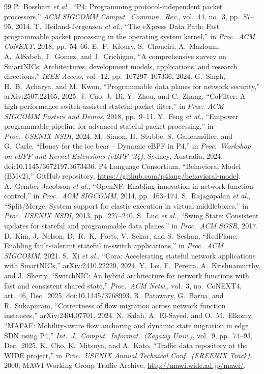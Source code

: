 \documentclass[10pt,twocolumn,letterpaper]{article}
\begin{document}
\begin{thebibliography}{99}\small
{} P.~Bosshart \emph{et al.}, ``P4: Programming protocol-independent packet processors,'' \emph{ACM SIGCOMM Comput.\ Commun.\ Rev.}, vol.~44, no.~3, pp.~87--95, 2014.
 T.~H{\o}iland-J{\o}rgensen \emph{et al.}, ``The eXpress Data Path: Fast programmable packet processing in the operating system kernel,'' in \emph{Proc.\ ACM CoNEXT}, 2018, pp.~54--66.
 E.~F.~Kfoury, S.~Choueiri, A.~Mazloum, A.~AlSabeh, J.~Gomez, and J.~Crichigno, ``A comprehensive survey on SmartNICs: Architectures, development models, applications, and research directions,'' \emph{IEEE Access}, vol.~12, pp.~107297--107336, 2024.
 G.~Singh, H.~B.~Acharya, and M.~Kwon, ``Programmable data planes for network security,'' arXiv:2507.22165, 2025.
 J.~Cao, J.~Bi, Y.~Zhou, and C.~Zhang, ``CoFilter: A high-performance switch-assisted stateful packet filter,'' in \emph{Proc.\ ACM SIGCOMM Posters and Demos}, 2018, pp.~9--11.
 Y.~Feng \emph{et al.}, ``Empower programmable pipeline for advanced stateful packet processing,'' in \emph{Proc.\ USENIX NSDI}, 2024.
 M.~Simon, H.~Stubbe, S.~Gallenm{\"u}ller, and G.~Carle, ``Honey for the ice bear -- Dynamic eBPF in P4,'' in \emph{Proc.\ Workshop on eBPF and Kernel Extensions (eBPF '24)}, Sydney, Australia, 2024, doi:10.1145/3672197.3673436.
 P4 Language Consortium, ``Behavioral Model (BMv2),'' GitHub repository, \url{https://github.com/p4lang/behavioral-model}.
 A.~Gember-Jacobson \emph{et al.}, ``OpenNF: Enabling innovation in network function control,'' in \emph{Proc.\ ACM SIGCOMM}, 2014, pp.~163--174.
 S.~Rajagopalan \emph{et al.}, ``Split/Merge: System support for elastic execution in virtual middleboxes,'' in \emph{Proc.\ USENIX NSDI}, 2013, pp.~227--240.
 S.~Luo \emph{et al.}, ``Swing State: Consistent updates for stateful and programmable data planes,'' in \emph{Proc.\ ACM SOSR}, 2017.
 D.~Kim, J.~Nelson, D.~R.~K.~Ports, V.~Sekar, and S.~Seshan, ``RedPlane: Enabling fault-tolerant stateful in-switch applications,'' in \emph{Proc.\ ACM SIGCOMM}, 2021.
 S.~Xi \emph{et al.}, ``Cora: Accelerating stateful network applications with SmartNICs,'' arXiv:2410.22229, 2024.
 Y.~Lei, F.~Pereira, A.~Krishnamurthy, and J.~Sherry, ``SwitchNIC: An hybrid architecture for network functions with fast and consistent shared state,'' \emph{Proc.\ ACM Netw.}, vol.~3, no.~CoNEXT4, art.~46, Dec.\ 2025, doi:10.1145/3768993.
 R.~Patowary, G.~Barua, and R.~Sukapuram, ``Correctness of flow migration across network function instances,'' arXiv:2404.07701, 2024.
 N.~Salah, A.~El-Sayed, and O.~M.~Elkomy, ``MAFAF: Mobility-aware flow anchoring and dynamic state migration in edge SDN using P4,'' \emph{Int.\ J.\ Comput.\ Informat.\ (Zagazig Univ.)}, vol.~9, pp.~74--93, Dec.\ 2025.
 K.~Cho, K.~Mitsuya, and A.~Kato, ``Traffic data repository at the WIDE project,'' in \emph{Proc.\ USENIX Annual Technical Conf.\ (FREENIX Track)}, 2000; MAWI Working Group Traffic Archive, \url{http://mawi.wide.ad.jp/mawi/}.
\end{thebibliography}
\end{document}
